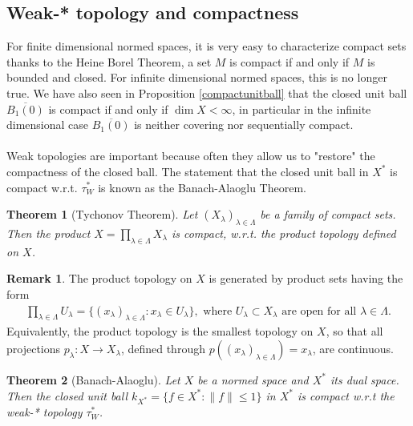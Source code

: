 \documentclass[11pt,a4paper]{article}
\newtheorem{thm}{Theorem}[section]
\theoremstyle{definition}
\newtheorem{rem}{Remark}[section]
\begin{document}
\subsection{Weak-* topology and compactness}
For finite dimensional normed spaces, it is very easy to characterize compact sets thanks to the Heine Borel Theorem, a set $M$ is compact if and only if $M$ is bounded and closed. For infinite dimensional normed spaces, this is no longer true. We have also seen in Proposition \ref{compactunitball} that the closed unit ball $\overline{B_1(0)}$ is compact if and only if $\dim X < \infty$, in particular in the infinite dimensional case $\overline{B_1(0)}$ is neither covering nor sequentially compact. 
\\\\
Weak topologies are important because often they allow us to "restore" the compactness of the closed ball. The statement that the closed unit ball in $X^*$ is compact w.r.t. $\tau_W^*$ is known as the Banach-Alaoglu Theorem. 
\begin{thm}[Tychonov Theorem] Let $(X_\lambda)_{ \lambda \in \Lambda}$ be a family of compact sets. Then the product $X= \prod_{\lambda \in \Lambda}  X_\lambda$ is compact, w.r.t. the product topology defined on $X$. 
\end{thm}
\begin{rem} The product topology on $X$ is generated by product sets having the form 
\begin{align*}
\prod_{ \lambda \in \Lambda} U_\lambda = \lbrace (x_\lambda)_{ \lambda \in \Lambda} :  x_\lambda \in U_\lambda \rbrace, \text{ where } U_\lambda \subset X_\lambda \text{ are open for all } \lambda \in \Lambda. 
\end{align*}
Equivalently, the product topology is the smallest topology on $X$, so that all projections $p_\lambda : X \to  X_\lambda$, defined through $p((x_\lambda)_{ \lambda \in \Lambda}) = x_\lambda$, are continuous. 
\end{rem}
\begin{thm}[Banach-Alaoglu] Let $X$ be a normed space and $X^*$ its dual space. Then the closed unit ball $k_{X^*} = \lbrace f \in X^* : \| f \| \leq 1 \rbrace$ in $X^*$ is compact w.r.t the weak-* topology $\tau_W^*$. 
\end{thm}
\end{document}
